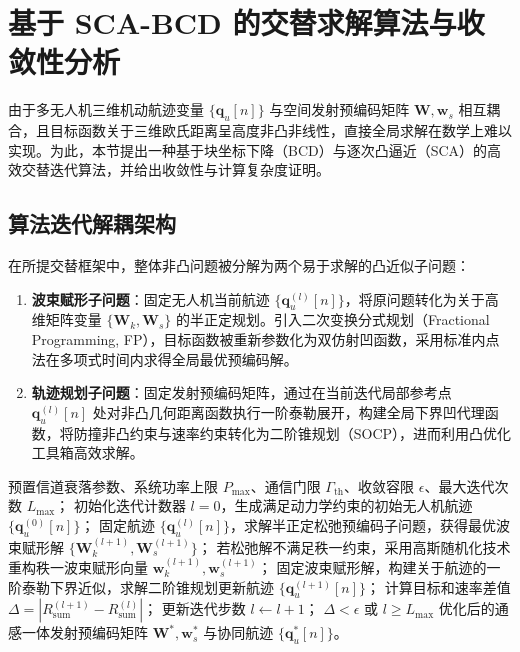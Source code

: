 \section{基于 SCA-BCD 的交替求解算法与收敛性分析}
\label{sec:algorithm_and_convergence}

由于多无人机三维机动航迹变量 $\{\mathbf{q}_u[n]\}$ 与空间发射预编码矩阵 $\mathbf{W}, \mathbf{w}_s$ 相互耦合，且目标函数关于三维欧氏距离呈高度非凸非线性，直接全局求解在数学上难以实现。为此，本节提出一种基于块坐标下降（BCD）与逐次凸逼近（SCA）的高效交替迭代算法，并给出收敛性与计算复杂度证明。

\subsection{算法迭代解耦架构}
在所提交替框架中，整体非凸问题被分解为两个易于求解的凸近似子问题：
\begin{enumerate}
  \item \textbf{波束赋形子问题}：固定无人机当前航迹 $\{\mathbf{q}_u^{(l)}[n]\}$，将原问题转化为关于高维矩阵变量 $\{\mathbf{W}_k, \mathbf{W}_s\}$ 的半正定规划。引入二次变换分式规划（Fractional Programming, FP），目标函数被重新参数化为双仿射凹函数，采用标准内点法在多项式时间内求得全局最优预编码解。
  \item \textbf{轨迹规划子问题}：固定发射预编码矩阵，通过在当前迭代局部参考点 $\mathbf{q}_u^{(l)}[n]$ 处对非凸几何距离函数执行一阶泰勒展开，构建全局下界凹代理函数，将防撞非凸约束与速率约束转化为二阶锥规划（SOCP），进而利用凸优化工具箱高效求解。
\end{enumerate}

\begin{algorithm}[H]
  \caption{基于 SCA-BCD 的通感一体波束赋形与航迹协同优化算法}
  \label{alg:ao_sca}
  \begin{algorithmic}[1]
    \REQUIRE 预置信道衰落参数、系统功率上限 $P_{\max}$、通信门限 $\Gamma_{\mathrm{th}}$、收敛容限 $\epsilon$、最大迭代次数 $L_{\max}$；
    \STATE 初始化迭代计数器 $l = 0$，生成满足动力学约束的初始无人机航迹 $\{\mathbf{q}_u^{(0)}[n]\}$；
    \REPEAT
      \STATE 固定航迹 $\{\mathbf{q}_u^{(l)}[n]\}$，求解半正定松弛预编码子问题，获得最优波束赋形解 $\{\mathbf{W}_k^{(l+1)}, \mathbf{W}_s^{(l+1)}\}$；
      \STATE 若松弛解不满足秩一约束，采用高斯随机化技术重构秩一波束赋形向量 $\mathbf{w}_k^{(l+1)}, \mathbf{w}_s^{(l+1)}$；
      \STATE 固定波束赋形解，构建关于航迹的一阶泰勒下界近似，求解二阶锥规划更新航迹 $\{\mathbf{q}_u^{(l+1)}[n]\}$；
      \STATE 计算目标和速率差值 $\Delta = |R_{\mathrm{sum}}^{(l+1)} - R_{\mathrm{sum}}^{(l)}|$；
      \STATE 更新迭代步数 $l \leftarrow l + 1$；
    \UNTIL $\Delta < \epsilon$ 或 $l \ge L_{\max}$
    \ENSURE 优化后的通感一体发射预编码矩阵 $\mathbf{W}^*, \mathbf{w}_s^*$ 与协同航迹 $\{\mathbf{q}_u^*[n]\}$。
  \end{algorithmic}
\end{algorithm}

